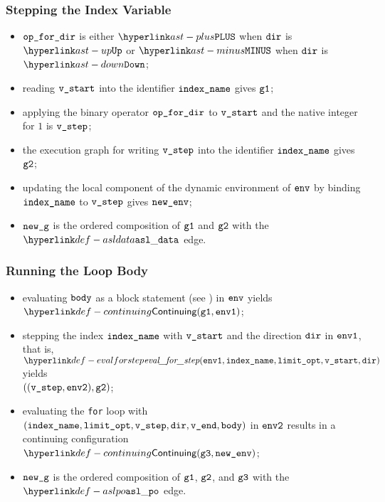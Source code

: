 \ProseParagraph
\subsubsection{Stepping the Index Variable}
\AllApply
\begin{itemize}
  \item $\texttt{op\_for\_dir}$ is either $\PLUS$ when $\texttt{dir}$ is $\UP$ or $\MINUS$ when $\texttt{dir}$ is $\DOWN$;
  \item reading $\texttt{v\_start}$ into the identifier $\texttt{index\_name}$ gives $\texttt{g1}$;
  \item applying the binary operator $\texttt{op\_for\_dir}$ to $\texttt{v\_start}$ and the native integer for $1$ is $\texttt{v\_step}$;
  \item the execution graph for writing $\texttt{v\_step}$ into the identifier $\texttt{index\_name}$ gives $\texttt{g2}$;
  \item updating the local component of the dynamic environment of $\texttt{env}$ by binding \\ $\texttt{index\_name}$ to $\texttt{v\_step}$
  gives $\texttt{new\_env}$;
  \item $\texttt{new\_g}$ is the ordered composition of $\texttt{g1}$ and $\texttt{g2}$ with the $\asldata$ edge.
\end{itemize}

\subsubsection{Running the Loop Body}
\AllApply
\begin{itemize}
  \item evaluating $\texttt{body}$ as a block statement (see ) in $\texttt{env}$
        yields \\ $\Continuing(\vgone, \envone)$\ProseTerminateAs{\ReturningConfig, \ThrowingConfig, \DynErrorConfig};
  \item stepping the index $\texttt{index\_name}$ with $\texttt{v\_start}$ and the direction $\texttt{dir}$ in $\texttt{env1}$,
        that is, $\evalforstep(\envone, \vindexname, \vlimitopt, \vstart, \dir)$ yields \\
        $((\texttt{v\_step}, \texttt{env2}), \texttt{g2})$;
  \item evaluating the \texttt{for} loop with $(\texttt{index\_name}, \texttt{limit\_opt}, \texttt{v\_step}, \texttt{dir}, \texttt{v\_end}, \texttt{body})$
        in $\texttt{env2}$ results in a continuing configuration $\Continuing(\vgthree, \newenv)$\ProseTerminateAs{\ReturningConfig, \ThrowingConfig, \DynErrorConfig};
  \item $\texttt{new\_g}$ is the ordered composition of $\texttt{g1}$, $\texttt{g2}$, and $\texttt{g3}$ with the $\aslpo$
        edge.
\end{itemize}

